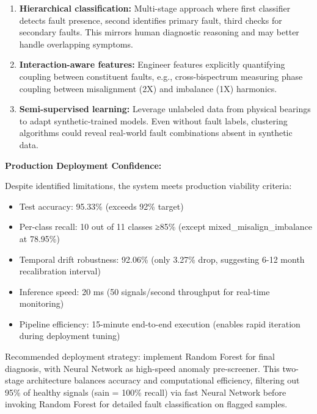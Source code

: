 \documentclass[11pt,a4paper]{article}
\begin{document}
\begin{enumerate}[itemsep=0.3em]
    \item \textbf{Hierarchical classification:} Multi-stage approach where first classifier detects fault presence, second identifies primary fault, third checks for secondary faults. This mirrors human diagnostic reasoning and may better handle overlapping symptoms.
    
    \item \textbf{Interaction-aware features:} Engineer features explicitly quantifying coupling between constituent faults, e.g., cross-bispectrum measuring phase coupling between misalignment (2X) and imbalance (1X) harmonics.
    
    \item \textbf{Semi-supervised learning:} Leverage unlabeled data from physical bearings to adapt synthetic-trained models. Even without fault labels, clustering algorithms could reveal real-world fault combinations absent in synthetic data.
\end{enumerate}

\textbf{Production Deployment Confidence:}

Despite identified limitations, the system meets production viability criteria:
\begin{itemize}[itemsep=0.2em]
    \item Test accuracy: 95.33\% (exceeds 92\% target)
    \item Per-class recall: 10 out of 11 classes ≥85\% (except mixed\_misalign\_imbalance at 78.95\%)
    \item Temporal drift robustness: 92.06\% (only 3.27\% drop, suggesting 6-12 month recalibration interval)
    \item Inference speed: 20 ms (50 signals/second throughput for real-time monitoring)
    \item Pipeline efficiency: 15-minute end-to-end execution (enables rapid iteration during deployment tuning)
\end{itemize}

Recommended deployment strategy: implement Random Forest for final diagnosis, with Neural Network as high-speed anomaly pre-screener. This two-stage architecture balances accuracy and computational efficiency, filtering out 95\% of healthy signals (sain = 100\% recall) via fast Neural Network before invoking Random Forest for detailed fault classification on flagged samples.

\end{document}
